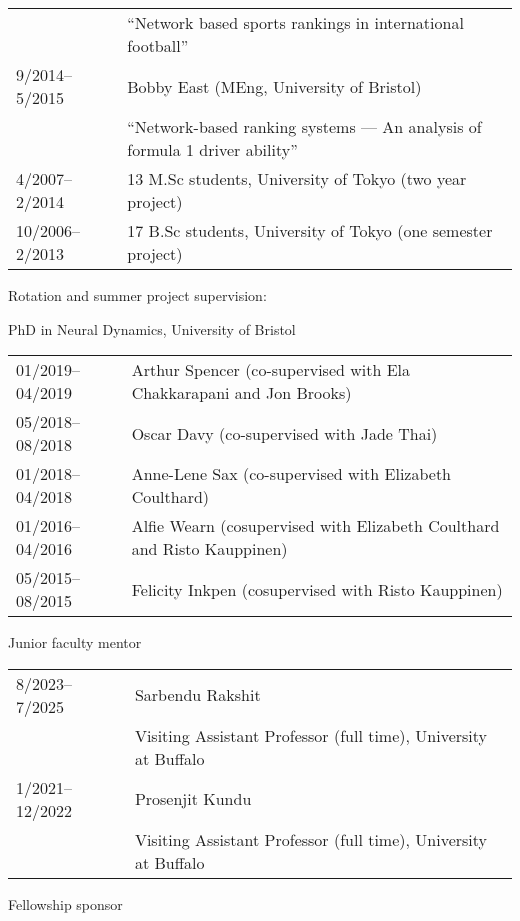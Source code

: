 \documentclass[11pt,letter]{article}
\renewenvironment{itemize}{
  \begin{list}{}{
    \setlength{\leftmargin}{1.5em}
    \setlength{\itemsep}{0.25em}
    \setlength{\parskip}{0pt}
    \setlength{\parsep}{0.25em}
  }
}{
  \end{list}
}
\begin{document}
\begin{itemize}
\begin{tabular}{ll}
& ``Network based sports rankings in international football''\\[1.5mm]
%
9/2014--5/2015 & Bobby East (MEng, University of Bristol)\\ %
& ``Network-based ranking systems --- An analysis of formula 1 driver ability''\\[1.5mm]
%
%
4/2007--2/2014 & 13 M.Sc students, University of Tokyo (two year project)\\[1.5mm]
%
10/2006--2/2013 & 17 B.Sc students, University of Tokyo (one semester project)
%
\end{tabular}

\smallskip

\bigskip

\item Rotation and summer project supervision:

PhD in Neural Dynamics, University of Bristol\\
\begin{tabular}{ll}
01/2019--04/2019 & Arthur Spencer (co-supervised with Ela Chakkarapani and Jon Brooks)\\[1.5mm]
%
05/2018--08/2018 & Oscar Davy (co-supervised with Jade Thai)\\[1.5mm]
%
01/2018--04/2018 & Anne-Lene Sax (co-supervised with Elizabeth Coulthard)\\[1.5mm]
%
01/2016--04/2016 & Alfie Wearn (cosupervised with Elizabeth Coulthard and Risto Kauppinen)\\[1.5mm]
%
05/2015--08/2015 & Felicity Inkpen (cosupervised with Risto Kauppinen)
\end{tabular}

\medskip

\bigskip

\item Junior faculty mentor

\medskip

\begin{tabular}{ll}
8/2023--7/2025 & Sarbendu Rakshit\\
& Visiting Assistant Professor (full time), University at Buffalo\\[1.5mm]
%
1/2021--12/2022 & Prosenjit Kundu\\
& Visiting Assistant Professor (full time), University at Buffalo
\end{tabular}

\item Fellowship sponsor


\end{itemize}
\end{document}
